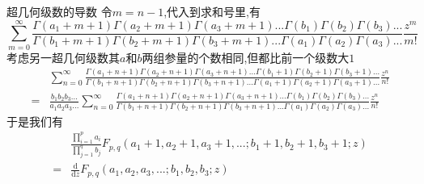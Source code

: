 \documentclass[zihao=-4,a4paper]{ctexart}
\begin{document}
\begin{mtheorem}{超几何级数的导数}
	令$m=n-1$,代入到求和号里,有
	\begin{equation*}
		\sum^{\infty}_{m=0} \frac{ {\Gamma} { \left( {a}_{1} + {m} + {1} \right) } {\Gamma} { \left( {a}_{2} + {m} + {1} \right) } {\Gamma} { \left( {a}_{3} + {m} + {1} \right) } ... {\Gamma} { \left( {b}_{1} \right) } {\Gamma} { { \left( {b}_{2} \right) } } {\Gamma} { { \left( {b}_{3} \right) } } ... } { {\Gamma} { \left( {b}_{1} + {m} + {1} \right) } {\Gamma} { \left( {b}_{2} + {m} + {1} \right) } {\Gamma} { \left( {b}_{3} + {m} + {1} \right) } ... {\Gamma} { \left( {a}_{1} \right) } {\Gamma} { { \left( {a}_{2} \right) } } {\Gamma} { { \left( {a}_{3} \right) } } ... } \frac{ {z}^{m} }{ {m} ! }
	\end{equation*}
	考虑另一超几何级数其$ {a} $和$ {b} $两组参量的个数相同,但都比前一个级数大$1$
	\begin{equation*}
		\begin{split}
			&\sum^{\infty}_{n=0} \frac{ {\Gamma} { \left( {a}_{1} + {n} + {1} \right) } {\Gamma} { \left( {a}_{2} + {n} + {1} \right) } {\Gamma} { \left( {a}_{3} + {n} + {1} \right) } ... {\Gamma} { \left( {b}_{1} + {1} \right) } {\Gamma} { \left( {b}_{2} + {1} \right) } {\Gamma} { \left( {b}_{3} + {1} \right) } ... } { {\Gamma} { \left( {b}_{1} + {n} + {1} \right) } {\Gamma} { \left( {b}_{2} + {n} + {1} \right) } {\Gamma} { \left( {b}_{3} + {n} + {1} \right) } ... {\Gamma} { \left( {a}_{1} + {1} \right) } {\Gamma} { { \left( {a}_{2} + {1} \right) } } {\Gamma} { { \left( {a}_{3} + {1} \right) } } ... } \frac{ {z}^{n} }{ {n} ! }\\
			=&\frac{ {b}_{1} {b}_{2} {b}_{3} ... }{ {a}_{1} {a}_{2} {a}_{3} ... } \sum^{\infty}_{n=0} \frac{ {\Gamma} { \left( {a}_{1} + {n} + {1} \right) } {\Gamma} { \left( {a}_{2} + {n} + {1} \right) } {\Gamma} { \left( {a}_{3} + {n} + {1} \right) } ... {\Gamma} { \left( {b}_{1} \right) } {\Gamma} { \left( {b}_{2} \right) } {\Gamma} { \left( {b}_{3} \right) } ... } { {\Gamma} { \left( {b}_{1} + {n} + {1} \right) } {\Gamma} { \left( {b}_{2} + {n} + {1} \right) } {\Gamma} { \left( {b}_{3} + {n} + {1} \right) } ... {\Gamma} { \left( {a}_{1} \right) } {\Gamma} { \left( {a}_{2} \right) } {\Gamma} { \left( {a}_{3} \right) } ... } \frac{ {z}^{n} }{ {n} ! }
		\end{split}
	\end{equation*}
	于是我们有
	\begin{equation}
		\begin{split}
			&\frac{ {\prod}^{p}_{i=1} {a}_{i} }{ {\prod}^{q}_{j=1} {b}_{j} } {F}_{ {p} , {q} } \left( {a}_{1} + {1} , {a}_{2} + {1} , {a}_{3} + {1} , ... ; {b}_{1} + {1} , {b}_{2} + {1} , {b}_{3} + {1} ; {z} \right)\\
			=&\frac{ \text{d} }{ \text{d} {z} } {F}_{ {p} , {q} } \left( {a}_{1} , {a}_{2} , {a}_{3} , ... ; {b}_{1} , {b}_{2} , {b}_{3} ; {z} \right)
		\end{split}
	\end{equation}
\end{mtheorem}
\end{document}
